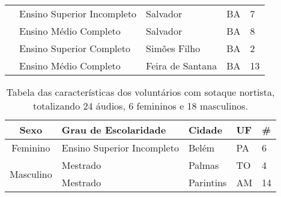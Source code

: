 \begin{table}[h]
\begin{tabular}{|l|l|l|l|l|}
                         & Ensino Superior Incompleto                & Salvador         & BA & 7                          \\ \cline{2-5} 
                          & Ensino Médio Completo                     & Salvador         & BA & 8                          \\ \cline{2-5} 
                         & Ensino Superior Completo                  & Simões Filho     & BA & 2                          \\ \cline{2-5} 
  & Ensino Médio Completo                     & Feira de Santana & BA & 13                         \\ \hline
\end{tabular}
\end{table}


\begin{table}[h]
\caption{Tabela das características dos voluntários com sotaque nortista, totalizando 24 áudios, 6 femininos e 18 masculinos.} \label{Tabela_nortista}
\begin{tabular}{|c|l|l|l|l|}
\hline
Sexo                       & Grau de Escolaridade       & Cidade    & UF & \# \\ \hline
Feminino                   & Ensino Superior Incompleto & Belém     & PA & 6  \\ \hline
\multirow{2}{*}{Masculino} & Mestrado                   & Palmas    & TO & 4  \\ \cline{2-5} 
                           & Mestrado                   & Parintins & AM & 14 \\ \hline
\end{tabular}
\end{table}


